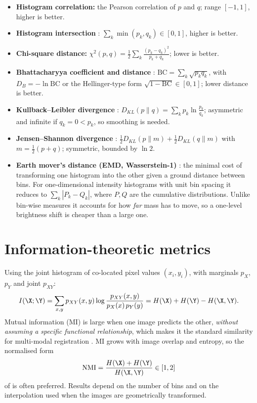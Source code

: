 \begin{itemize}
  \item \textbf{Histogram correlation:} the Pearson correlation of $p$ and $q$; range $[-1,1]$, higher is better.
  \item \textbf{Histogram intersection} \citep{swain1991}: $\sum_k\min(p_k,q_k)\in[0,1]$, higher is better.
  \item \textbf{Chi-square distance:} $\chi^2(p,q)=\tfrac12\sum_k \frac{(p_k-q_k)^2}{p_k+q_k}$; lower is better.
  \item \textbf{Bhattacharyya coefficient and distance} \citep{bhattacharyya1943}: $\mathrm{BC}=\sum_k\sqrt{p_kq_k}$, with $D_B=-\ln\mathrm{BC}$ or the Hellinger-type form $\sqrt{1-\mathrm{BC}}\in[0,1]$; lower distance is better.
  \item \textbf{Kullback--Leibler divergence} \citep{kullback1951}: $D_{KL}(p\|q)=\sum_k p_k\ln\frac{p_k}{q_k}$; asymmetric and infinite if $q_k=0<p_k$, so smoothing is needed.
  \item \textbf{Jensen--Shannon divergence} \citep{lin1991js}: $\tfrac12D_{KL}(p\|m)+\tfrac12D_{KL}(q\|m)$ with $m=\tfrac12(p+q)$; symmetric, bounded by $\ln 2$.
  \item \textbf{Earth mover's distance (EMD, Wasserstein-1)} \citep{rubner2000}: the minimal cost of transforming one histogram into the other given a ground distance between bins. For one-dimensional intensity histograms with unit bin spacing it reduces to $\sum_k|P_k-Q_k|$, where $P,Q$ are the cumulative distributions. Unlike bin-wise measures it accounts for how \emph{far} mass has to move, so a one-level brightness shift is cheaper than a large one.
\end{itemize}

\section{Information-theoretic metrics}

Using the joint histogram of co-located pixel values $(x_i,y_i)$, with marginals $p_X$, $p_Y$ and joint $p_{XY}$:
\[
I(\X;\Y)=\sum_{x,y}p_{XY}(x,y)\log\frac{p_{XY}(x,y)}{p_X(x)\,p_Y(y)}=H(\X)+H(\Y)-H(\X,\Y).
\]
Mutual information (MI) is large when one image predicts the other, \emph{without assuming a specific functional relationship}, which makes it the standard similarity for multi-modal registration \citep{viola1997,maes1997}. MI grows with image overlap and entropy, so the normalised form
\[
\mathrm{NMI}=\frac{H(\X)+H(\Y)}{H(\X,\Y)}\in[1,2]
\]
of \citet{studholme1999} is often preferred. Results depend on the number of bins and on the interpolation used when the images are geometrically transformed.

